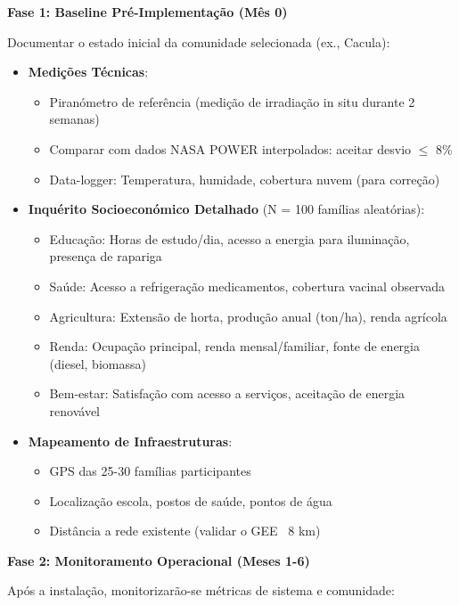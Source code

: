 \documentclass[12pt, a4paper]{article}
\begin{document}
\textbf{Fase 1: Baseline Pré-Implementação (Mês 0)}

Documentar o estado inicial da comunidade selecionada (ex., Cacula):

\begin{itemize}
\item \textbf{Medições Técnicas}:
  \begin{itemize}
  \item Piranómetro de referência (medição de irradiação in situ durante 2 semanas)
  \item Comparar com dados NASA POWER interpolados: aceitar desvio \(\leq\) 8\%
  \item Data-logger: Temperatura, humidade, cobertura nuvem (para correção)
  \end{itemize}

\item \textbf{Inquérito Socioeconómico Detalhado} (N = 100 famílias aleatórias):
  \begin{itemize}
  \item Educação: Horas de estudo/dia, acesso a energia para iluminação, presença de rapariga
  \item Saúde: Acesso a refrigeração medicamentos, cobertura vacinal observada
  \item Agricultura: Extensão de horta, produção anual (ton/ha), renda agrícola
  \item Renda: Ocupação principal, renda mensal/familiar, fonte de energia (diesel, biomassa)
  \item Bem-estar: Satisfação com acesso a serviços, aceitação de energia renovável
  \end{itemize}

\item \textbf{Mapeamento de Infraestruturas}:
  \begin{itemize}
  \item GPS das 25-30 famílias participantes
  \item Localização escola, postos de saúde, pontos de água
  \item Distância a rede existente (validar o GEE ~8 km)
  \end{itemize}
\end{itemize}

\textbf{Fase 2: Monitoramento Operacional (Meses 1-6)}

Após a instalação, monitorizarão-se métricas de sistema e comunidade:
\end{document}
